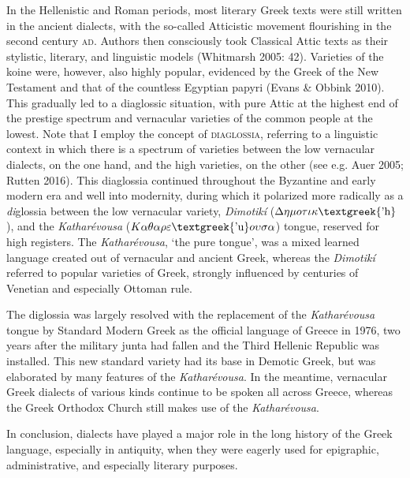 \documentclass[12pt]{article}
\newenvironment{styleStandard}{\renewcommand\baselinestretch{1.25}\setlength\leftskip{0in}\setlength\rightskip{0in}\setlength\parindent{0.1972in}\setlength\parfillskip{0pt plus 1fil}\setlength\parskip{0in plus 1pt}\writerlistparindent\writerlistleftskip\leavevmode\normalfont\normalsize\writerlistlabel\ignorespaces}{\unskip\vspace{0in plus 1pt}\par}
\newcommand\writerlistleftskip{}
\newcommand\writerlistparindent{}
\newcommand\writerlistlabel{}
\begin{document}
\begin{styleStandard}
In the Hellenistic and Roman periods, most literary Greek texts were still written in the ancient dialects, with the so-called Atticistic movement flourishing in the second century \textsc{ad}. Authors then consciously took Classical Attic texts as their stylistic, literary, and linguistic models (Whitmarsh 2005: 42). Varieties of the koine were, however, also highly popular, evidenced by the Greek of the New Testament and that of the countless Egyptian papyri (Evans \& Obbink 2010). This gradually led to a diaglossic situation, with pure Attic at the highest end of the prestige spectrum and vernacular varieties of the common people at the lowest. Note that I employ the concept of \textsc{diaglossia}, referring to a linguistic context in which there is a spectrum of varieties between the low vernacular dialects, on the one hand, and the high varieties, on the other (see e.g. Auer 2005; Rutten 2016). This diaglossia continued throughout the Byzantine and early modern era and well into modernity, during which it polarized more radically as a \textit{di}glossia between the low vernacular variety, \textit{Dimotikí} ($\Delta \eta \mu o\tau \iota \kappa \text{\textgreek{'h}}$), and the \textit{Katharévousa} ($K\alpha \theta \alpha \rho \varepsilon \text{\textgreek{'u}}o\upsilon \sigma \alpha $) tongue, reserved for high registers. The \textit{Katharévousa}, ‘the pure tongue’, was a mixed learned language created out of vernacular and ancient Greek, whereas the \textit{Dimotikí }referred to popular varieties of Greek, strongly influenced by centuries of Venetian and especially Ottoman rule.
\end{styleStandard}

\begin{styleStandard}
The diglossia was largely resolved with the replacement of the \textit{Katharévousa} tongue by Standard Modern Greek as the official language of Greece in 1976, two years after the military junta had fallen and the Third Hellenic Republic was installed. This new standard variety had its base in Demotic Greek, but was elaborated by many features of the \textit{Katharévousa}. In the meantime, vernacular Greek dialects of various kinds continue to be spoken all across Greece, whereas the Greek Orthodox Church still makes use of the \textit{Katharévousa}.
\end{styleStandard}

\begin{styleStandard}
In conclusion, dialects have played a major role in the long history of the Greek language, especially in antiquity, when they were eagerly used for epigraphic, administrative, and especially literary purposes.
\end{styleStandard}
\end{document}
